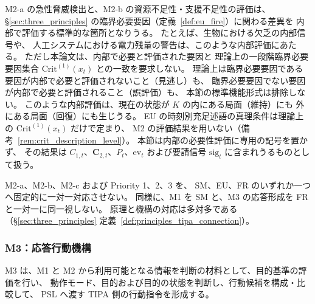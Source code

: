 \begin{remark}[内部の必要性評価と臨界必要要因]
\label{rem:m2_need_evaluation}
M2-a の急性脅威検出と、M2-b の資源不足性・支援不足性の評価は、
\S\ref{sec:three_principles} の臨界必要要因（定義~\ref{def:eu_fire}）に関わる差異を
内部で評価する標準的な箇所となりうる。
たとえば、生物における欠乏の内部信号や、
人工システムにおける電力残量の警告は、このような内部評価にあたる。
ただし本論文は、内部で必要と評価された要因と
理論上の一段階臨界必要要因集合 $\mathrm{Crit}^{(1)}(x_t)$ との一致を要求しない。
理論上は臨界必要要因である要因が内部で必要と評価されないこと（見逃し）も、
臨界必要要因でない要因が内部で必要と評価されること（誤評価）も、
本節の標準機能形式は排除しない。
このような内部評価は、現在の状態が $K$ の内にある局面（維持）にも
外にある局面（回復）にも生じうる。
EU の時刻別充足述語の真理条件は理論上の $\mathrm{Crit}^{(1)}(x_t)$ だけで定まり、
M2 の評価結果を用いない（備考~\ref{rem:crit_description_level}）。
本節は内部の必要性評価に専用の記号を置かず、
その結果は $C_{1,t}$、$\mathbf C_{2,t}$、$P_t$、$\mathrm{ev}_t$ および要請信号 $\mathrm{sig}_t$ に含まれうるものとして扱う。
\end{remark}

\begin{remark}[TIPAと三原理の多対多対応]
\label{rem:m2_three_principles}
M2-a、M2-b、M2-c および Priority 1、2、3 を、
SM、EU、FR のいずれか一つへ固定的に一対一対応させない。
同様に、M1 を SM と、M3 の応答形成を FR と一対一に同一視しない。
原理と機構の対応は多対多である（\S\ref{sec:three_principles} 定義~\ref{def:principles_tipa_connection}）。
\end{remark}


\subsubsection{M3：応答行動機構}
\label{subsec:m3}

M3 は、M1 と M2 から利用可能となる情報を判断の材料として、目的基準の評価を行い、
動作モード、目的および目的の状態を判断し、行動候補を構成・比較して、
PSL へ渡す TIPA 側の行動指令を形成する。

